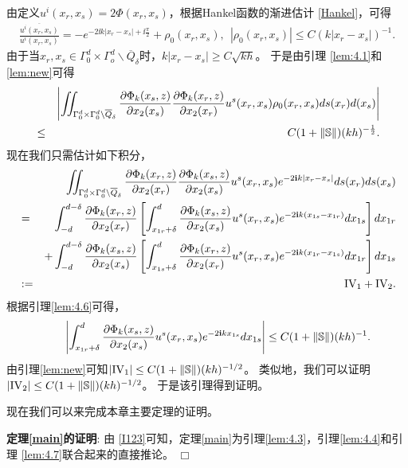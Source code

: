 \debproof
由定义$u^i(x_r,x_s)=2\Phi(x_r,x_s)$，根据Hankel函数的渐进估计 \eqref{Hankel}，可得
\begin{eqnarray*}
  \frac{\overline{u^i(x_r,x_s)}}{u^i(x_r,x_s)}=-e^{-2\ii k|x_r-x_s|+\ii\frac{\pi}{2}}+\rho_0(x_r,x_s),\  \  |\rho_0(x_r,x_s)|\leq C(k|x_r-x_s|)^{-1}.
\end{eqnarray*}
由于当$x_r,x_s\in\Gamma_0^d\times\Gamma_o^d\backslash\overline Q_\delta$时，$k|x_r-x_s|\geq C\sqrt{kh}$。 于是由引理 \ref{lem:4.1}和\ref{lem:new}可得
\begin{eqnarray}\label{d1}
& &\left|\int\hskip-6pt\int_{\Gamma_0^d\times \Gamma_0^d\backslash \overline Q_\delta}\frac{\partial\Phi_k(x_s,z)}{\partial x_2(x_s)}\frac{\partial\Phi_k(x_r,z)}{\partial x_2(x_r)}
  u^s(x_r,x_s)\rho_0(x_r,x_s)
  ds(x_r)d(x_s)\right| \nonumber\\
  &\leq&C(1+\|\mathbb{S}\|)(kh)^{-\frac{1}{2}}.
\end{eqnarray}
现在我们只需估计如下积分，
\begin{eqnarray}
& &\int\hskip-6pt\int_{\Gamma_0^d\times \Gamma_0^d\backslash \overline Q_\delta}
\frac{\partial\Phi_k(x_r,z)}{\partial x_2(x_r)}\frac{\partial\Phi_k(x_s,z)}
{\partial x_2(x_s)}u^s(x_r,x_s) e^{-2\mathbf{i} k |x_r-x_s|} ds(x_r)ds(x_s)\nonumber\\
&=&\int_{-d}^{d-\delta} \frac{\partial\Phi_k(x_r,z)}{\partial x_2(x_r)}\left[\int_{x_{1r}+\delta}^{d} \frac{\partial\Phi_k(x_s,z)}{\partial x_2(x_s)}u^s(x_r,x_s) e^{-2\mathbf{i} k (x_{1s}-x_{1r})} dx_{1s}\right] dx_{1r}\nonumber\\
& &+\int_{-d}^{d-\delta} \frac{\partial\Phi_k(x_s,z)}{\partial x_2(x_s)}
\left[\int_{x_{1s}+\delta}^{d} \frac{\partial\Phi_k(x_r,z)}{\partial x_2(x_r)}u^s(x_r,x_s) e^{-2\mathbf{i} k (x_{1r}-x_{1s})}
dx_{1r}\right] dx_{1s}\nonumber\\
&:=&{\rm IV}_1+{\rm IV}_2.\label{d2}
\end{eqnarray}
根据引理\ref{lem:4.6}可得，
\begin{eqnarray}
	 \qquad \left|\int_{x_{1r}+\delta}^{d} \frac{\partial\Phi_k(x_s,z)}{\partial x_2(x_s)}u^s(x_r,x_s) e^{-2\mathbf{i} kx_{1s}} dx_{1s} \right|\leq C(1+\|\mathbb{S}\|)(kh)^{-1}.
\end{eqnarray}
由引理\ref{lem:new}可知$|{\rm IV}_1|\leq C(1+\|\mathbb{S}\|)(kh)^{-1/2}$。 类似地，我们可以证明$|{\rm IV}_2|\leq C(1+\|\mathbb{S}\|)(kh)^{-1/2}$。
于是该引理得到证明。
\finproof

现在我们可以来完成本章主要定理的证明。

{\bf 定理\ref{main}的证明}: 由 \eqref{I123}可知，定理\ref{main}为引理\ref{lem:4.3}，引理\ref{lem:4.4}和引理
\ref{lem:4.7}联合起来的直接推论。
$\Box$
